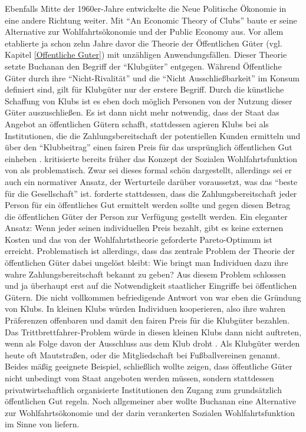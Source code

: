 Ebenfalls Mitte der 1960er-Jahre entwickelte \textcite{Buchanan1965} die Neue Politische Ökonomie in eine andere Richtung weiter. Mit "`An Economic Theory of Clubs"' baute er seine Alternative zur Wohlfahrtsökonomie und der Public Economy aus. Vor allem \textcite{Samuelson1954, Samuelson1955} etablierte ja schon zehn Jahre davor die Theorie der Öffentlichen Güter (vgl. Kapitel \ref{Offentliche Guter}) mit unzähligen Anwendungsfällen. Dieser Theorie setzte Buchanan den Begriff der "`Klubgüter"' entgegen. Während Öffentliche Güter durch ihre "`Nicht-Rivalität"' und die "`Nicht Ausschließbarkeit"' im Konsum definiert sind, gilt für Klubgüter nur der erstere Begriff. Durch die künstliche Schaffung von Klubs ist es eben doch möglich Personen von der Nutzung dieser Güter auszuschließen. Es ist dann nicht mehr notwendig, dass der Staat das Angebot an öffentlichen Gütern schafft, stattdessen agieren Klubs bei \textcite{Buchanan1965} als Institutionen, die die Zahlungsbereitschaft der potentiellen Kunden ermitteln und über den "`Klubbeitrag"' einen fairen Preis für das ursprünglich öffentlichen Gut einheben \parencite[S. 244]{Marciano2021}. \textcite{Buchanan1959} kritisierte bereits früher das Konzept der Sozialen Wohlfahrtsfunktion von \textcite{Samuelson1954} als problematisch. Zwar sei dieses formal schön dargestellt, allerdings sei er auch ein normativer Ansatz, der Werturteile darüber voraussetzt, was das "`beste für die Gesellschaft"' ist. \textcite{Buchanan1965} forderte stattdessen, dass die Zahlungsbereitschaft jeder Person für ein öffentliches Gut ermittelt werden sollte und gegen diesen Betrag die öffentlichen Güter der Person zur Verfügung gestellt werden. Ein eleganter Ansatz: Wenn jeder seinen individuellen Preis bezahlt, gibt es keine externen Kosten und das von der Wohlfahrtstheorie geforderte Pareto-Optimum ist erreicht. Problematisch ist allerdings, dass das zentrale Problem der Theorie der öffentlichen Güter dabei ungelöst bleibt: Wie bringt man Individuen dazu ihre wahre Zahlungsbereitschaft bekannt zu geben? Aus diesem Problem schlossen \textcite{Musgrave1939} und \textcite{Samuelson1954} ja überhaupt erst auf die Notwendigkeit staatlicher Eingriffe bei öffentlichen Gütern. Die nicht vollkommen befriedigende Antwort von \textcite{Buchanan1965} war eben die Gründung von Klubs. In kleinen Klubs würden Individuen kooperieren, also ihre wahren Präferenzen offenbaren und damit den fairen Preis für die Klubgüter bezahlen. Das Trittbrettfahrer-Problem würde in diesen kleinen Klubs dann nicht auftreten, wenn als Folge davon der Ausschluss aus dem Klub droht \parencite{Buchanan1965}. Als Klubgüter werden heute oft Mautstraßen, oder die Mitgliedschaft bei Fußballvereinen genannt. Beides mäßig geeignete Beispiel, schließlich wollte \textcite{Buchanan1965} zeigen, dass öffentliche Güter nicht unbedingt vom Staat angeboten werden müssen, sondern stattdessen privatwirtschaftlich organisierte Institutionen den Zugang zum grundsätzlich öffentlichen Gut regeln. Noch allgemeiner aber wollte Buchanan eine Alternative zur Wohlfahrtsökonomie und der darin verankerten Sozialen Wohlfahrtsfunktion im Sinne von \textcite{Samuelson1954, Samuelson1955} liefern.


